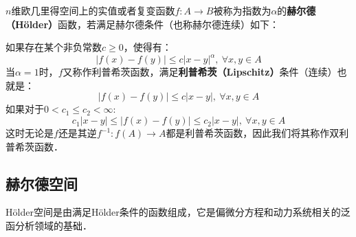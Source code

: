 \begin{issues}
\issueDraft
\end{issues}
$n$维欧几里得空间上的实值或者复变函数$f:A \rightarrow B$被称为指数为$\alpha$的\textbf{赫尔德（Hölder）}函数，若满足赫尔德条件（也称赫尔德连续）如下：

如果存在某个非负常数$c\geq 0$，使得有：
\begin{equation}
|f(x)-f(y)|\leq c|x-y|^\alpha,\ \forall x,y \in A
\end{equation}
当$\alpha=1$时，$f$又称作利普希茨函数，满足\textbf{利普希茨（Lipschitz）}条件（连续）也就是：
\begin{equation}
|f(x)-f(y)|\leq c|x-y|,\ \forall x,y \in A
\end{equation}
如果对于$0<c_1\leq c_2<\infty $:
\begin{equation}
c_1|x-y|\leq |f(x)-f(y)|\leq  c_2|x-y|,\ \forall x,y \in A
\end{equation}
这时无论是$f$还是其逆$f^{-1}:f(A)\rightarrow A$都是利普希茨函数，因此我们将其称作双利普希茨函数．

\subsection{赫尔德空间}
Hölder空间是由满足Hölder条件的函数组成，它是偏微分方程和动力系统相关的泛函分析领域的基础．